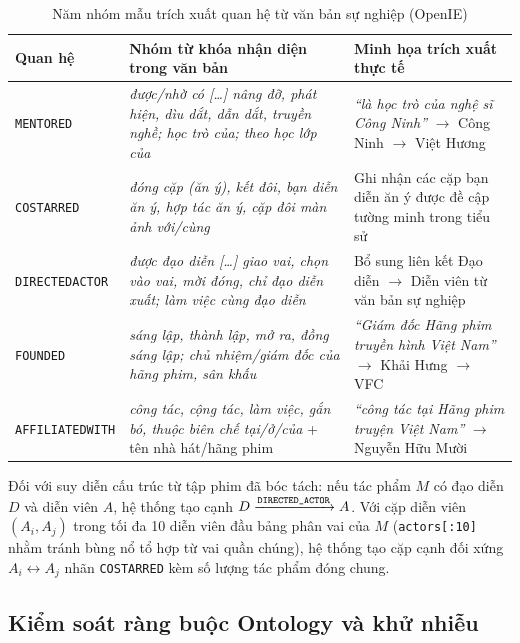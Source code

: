 \documentclass[12pt,a4paper]{article}
\renewcommand{\_}{\oldunderscore\hspace{0pt}}
\begin{document}
\begin{table}[htbp]
\centering
\small
\begin{tabularx}{\textwidth}{P{3.0cm} L P{4.7cm}}
\toprule
Quan hệ & Nhóm từ khóa nhận diện trong văn bản & Minh họa trích xuất thực tế \\
\midrule
\texttt{MENTORED} &
\textit{được/\allowbreak nhờ có [\dots] nâng đỡ, phát hiện, dìu dắt, dẫn dắt, truyền nghề; học trò của; theo học lớp của} &
\textit{``là học trò của nghệ sĩ Công Ninh''} $\to$ Công Ninh $\to$ Việt Hương \\
\midrule
\texttt{CO\_STARRED} &
\textit{đóng cặp (ăn ý), kết đôi, bạn diễn ăn ý, hợp tác ăn ý, cặp đôi màn ảnh với/\allowbreak cùng} &
Ghi nhận các cặp bạn diễn ăn ý được đề cập tường minh trong tiểu sử \\
\midrule
\texttt{DIRECTED\_ACTOR} &
\textit{được đạo diễn [\dots] giao vai, chọn vào vai, mời đóng, chỉ đạo diễn xuất; làm việc cùng đạo diễn} &
Bổ sung liên kết Đạo diễn $\to$ Diễn viên từ văn bản sự nghiệp \\
\midrule
\texttt{FOUNDED} &
\textit{sáng lập, thành lập, mở ra, đồng sáng lập; chủ nhiệm/\allowbreak giám đốc của hãng phim, sân khấu} &
\textit{``Giám đốc Hãng phim truyền hình Việt Nam''} $\to$ Khải Hưng $\to$ VFC \\
\midrule
\texttt{AFFILIATED\_WITH} &
\textit{công tác, cộng tác, làm việc, gắn bó, thuộc biên chế tại/\allowbreak ở/\allowbreak của} + tên nhà hát/\allowbreak hãng phim &
\textit{``công tác tại Hãng phim truyện Việt Nam''} $\to$ Nguyễn Hữu Mười \\
\bottomrule
\end{tabularx}
\caption{Năm nhóm mẫu trích xuất quan hệ từ văn bản sự nghiệp (OpenIE)}
\label{tab:openie-patterns}
\end{table}

Đối với suy diễn cấu trúc từ tập phim đã bóc tách: nếu tác phẩm $M$ có đạo diễn $D$ và diễn viên $A$, hệ thống tạo cạnh $D \xrightarrow{\texttt{DIRECTED\_ACTOR}} A$. Với cặp diễn viên $(A_i, A_j)$ trong tối đa 10 diễn viên đầu bảng phân vai của $M$ (\texttt{actors[:10]} nhằm tránh bùng nổ tổ hợp từ vai quần chúng), hệ thống tạo cặp cạnh đối xứng $A_i \leftrightarrow A_j$ nhãn \texttt{CO\_STARRED} kèm số lượng tác phẩm đóng chung.

\subsection{Kiểm soát ràng buộc Ontology và khử nhiễu}
\end{document}
